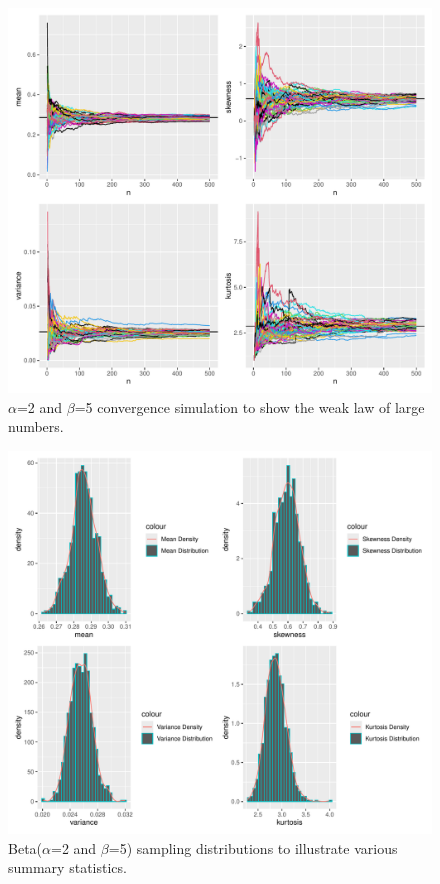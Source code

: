 \documentclass{article}\usepackage[]{graphicx}\usepackage[]{xcolor}
\begin{document}
\begin{figure}[ht]
  \begin{center}
  \includegraphics[width=\textwidth]{Rplot.pdf}
  \caption{$\alpha$=2 and $\beta$=5 convergence simulation to show the weak law of large numbers.}
  \label{plot1}
  \end{center}
\end{figure}

\begin{figure}[ht]
  \begin{center}
  \includegraphics[width=\textwidth]{Rplot01.pdf}
  \caption{Beta($\alpha$=2 and $\beta$=5) sampling distributions to illustrate various summary statistics.}
  \label{plot2}
  \end{center}
\end{figure}
\end{document}
